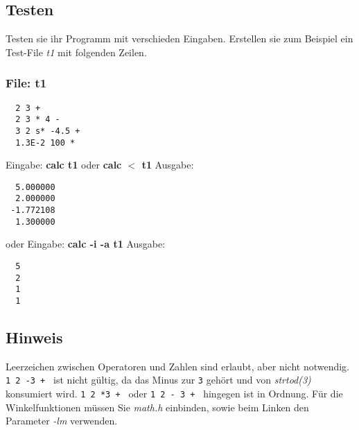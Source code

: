 \documentclass{article}
\begin{document}
\subsection*{Testen}
Testen sie ihr Programm mit verschieden Eingaben. Erstellen sie zum Beispiel ein Test-File \emph{t1} mit folgenden Zeilen.

\subsubsection*{File: t1}
\begin{verbatim}
  2 3 +
  2 3 * 4 -
  3 2 s* -4.5 + 
  1.3E-2 100 *
\end{verbatim}
Eingabe: {\bf calc t1} oder {\bf calc $<$ t1}
Ausgabe: 
\begin{verbatim}
  5.000000
  2.000000
 -1.772108
  1.300000
\end{verbatim}
oder
Eingabe: {\bf calc -i -a t1}
Ausgabe: 
\begin{verbatim}
  5
  2
  1
  1
\end{verbatim}

\subsection*{Hinweis}
Leerzeichen zwischen Operatoren und Zahlen sind erlaubt, aber nicht notwendig. \verb|1 2 -3 + | ist nicht gültig, da das Minus zur \verb|3| gehört und von \emph{strtod(3)} konsumiert wird. \verb|1 2 *3 + | oder \verb|1 2 - 3 + | hingegen ist in Ordnung.
Für die Winkelfunktionen müssen Sie \emph{math.h} einbinden, sowie beim Linken den Parameter \emph{-lm} verwenden.
\end{document}
